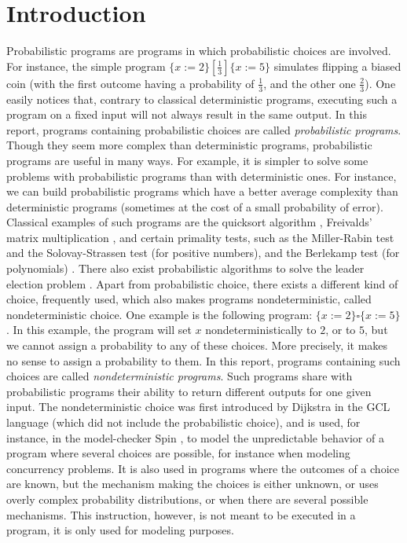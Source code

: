\documentclass[a4paper,10pt]{llncs}
\begin{document}
\section{Introduction}
\label{sec:intro}
Probabilistic programs are programs in which probabilistic choices are involved. For instance, the simple program $\{ x := 2 \} [\frac{1}{3}] \{ x := 5 \}$ simulates flipping a biased coin (with the first outcome having a probability of $\frac{1}{3}$, and the other one $\frac{2}{3}$). One easily notices that, contrary to classical deterministic programs, executing such a program on a fixed input will not always result in the same output. In this report, programs containing probabilistic choices are called \emph{probabilistic programs}. Though they seem more complex than deterministic programs, probabilistic programs are useful in many ways. For example, it is simpler to solve some problems with probabilistic programs than with deterministic ones. For instance, we can build probabilistic programs which have a better average complexity than deterministic programs (sometimes at the cost of a small probability of error). Classical examples of such programs are the quicksort algorithm \cite{Hoare61}, Freivalds' matrix multiplication \cite{Freivalds77}, and certain primality tests, such as the Miller-Rabin test \cite{Rabin77} and the Solovay-Strassen test \cite{SolovayStrassen77} (for positive numbers), and the Berlekamp test (for polynomials) \cite{Berlekamp67}. There also exist probabilistic algorithms to solve the leader election problem \cite{Ramanathan04}.\newline 
Apart from probabilistic choice, there exists a different kind of choice, frequently used, which also makes programs nondeterministic, called nondeterministic choice. One example is the following program: $\{ x := 2 \} \square \{ x := 5 \}$. In this example, the program will set $x$ nondeterministically to $2$, or to $5$, but we cannot assign a probability to any of these choices. More precisely, it makes no sense to assign a probability to them. In this report, programs containing such choices are called \emph{nondeterministic programs}. Such programs share with probabilistic programs their ability to return different outputs for one given input. The nondeterministic choice was first introduced by Dijkstra in the GCL language \cite{Dijkstra76} (which did not include the probabilistic choice), and is used, for instance, in the model-checker Spin \cite{Holzmann97}, to model the unpredictable behavior of a program where several choices are possible, for instance when modeling concurrency problems. It is also used in programs where the outcomes of a choice are known, but the mechanism making the choices is either unknown, or uses overly complex probability distributions, or when there are several possible mechanisms. \cite{McIver05} This instruction, however, is not meant to be executed in a program, it is only used for modeling purposes.\bigskip
\end{document}
